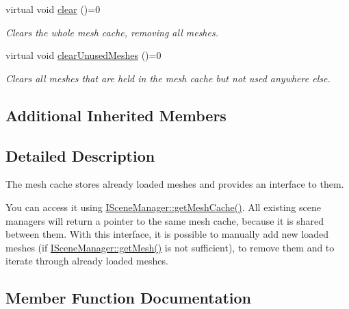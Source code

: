 \begin{DoxyCompactItemize}
virtual void \hyperlink{classirr_1_1scene_1_1IMeshCache_ad92d924e558c3a7504f9154ee29b1569}{clear} ()=0
\begin{DoxyCompactList}\small\item\em Clears the whole mesh cache, removing all meshes. \end{DoxyCompactList}\item 
virtual void \hyperlink{classirr_1_1scene_1_1IMeshCache_a9f3e20b8e0f66d59bc454a311d13bbee}{clear\+Unused\+Meshes} ()=0
\begin{DoxyCompactList}\small\item\em Clears all meshes that are held in the mesh cache but not used anywhere else. \end{DoxyCompactList}\end{DoxyCompactItemize}
\subsection*{Additional Inherited Members}


\subsection{Detailed Description}
The mesh cache stores already loaded meshes and provides an interface to them. 

You can access it using \hyperlink{classirr_1_1scene_1_1ISceneManager_a45d89c816e33abe0e77eb063d7ce58a8}{I\+Scene\+Manager\+::get\+Mesh\+Cache()}. All existing scene managers will return a pointer to the same mesh cache, because it is shared between them. With this interface, it is possible to manually add new loaded meshes (if \hyperlink{classirr_1_1scene_1_1ISceneManager_a63894c3f3d46cfc385116f1705935e03}{I\+Scene\+Manager\+::get\+Mesh()} is not sufficient), to remove them and to iterate through already loaded meshes. 

\subsection{Member Function Documentation}
\mbox{\label{classirr_1_1scene_1_1IMeshCache_a2959812a3a393817b1db42761766c49b}} 
